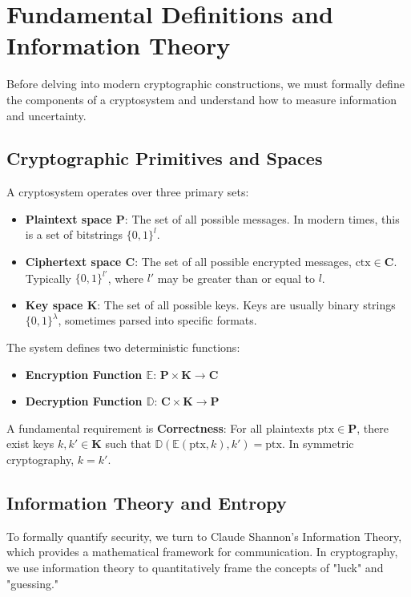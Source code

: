 \section{Fundamental Definitions and Information Theory}

Before delving into modern cryptographic constructions, we must formally define the components of a cryptosystem and understand how to measure information and uncertainty.

\subsection{Cryptographic Primitives and Spaces}
A cryptosystem operates over three primary sets:
\begin{itemize}
    \item \textbf{Plaintext space $\mathbf{P}$}: The set of all possible messages. In modern times, this is a set of bitstrings $\{0,1\}^l$.
    \item \textbf{Ciphertext space $\mathbf{C}$}: The set of all possible encrypted messages, $\text{ctx} \in \mathbf{C}$. Typically $\{0,1\}^{l'}$, where $l'$ may be greater than or equal to $l$.
    \item \textbf{Key space $\mathbf{K}$}: The set of all possible keys. Keys are usually binary strings $\{0,1\}^\lambda$, sometimes parsed into specific formats.
\end{itemize}

The system defines two deterministic functions:
\begin{itemize}
    \item \textbf{Encryption Function $\mathbb{E}$}: $\mathbf{P} \times \mathbf{K} \rightarrow \mathbf{C}$
    \item \textbf{Decryption Function $\mathbb{D}$}: $\mathbf{C} \times \mathbf{K} \rightarrow \mathbf{P}$
\end{itemize}
A fundamental requirement is \textbf{Correctness}: For all plaintexts $\text{ptx} \in \mathbf{P}$, there exist keys $k, k' \in \mathbf{K}$ such that $\mathbb{D}(\mathbb{E}(\text{ptx}, k), k') = \text{ptx}$. In symmetric cryptography, $k = k'$.

\subsection{Information Theory and Entropy}
To formally quantify security, we turn to Claude Shannon's Information Theory, which provides a mathematical framework for communication. In cryptography, we use information theory to quantitatively frame the concepts of "luck" and "guessing."

